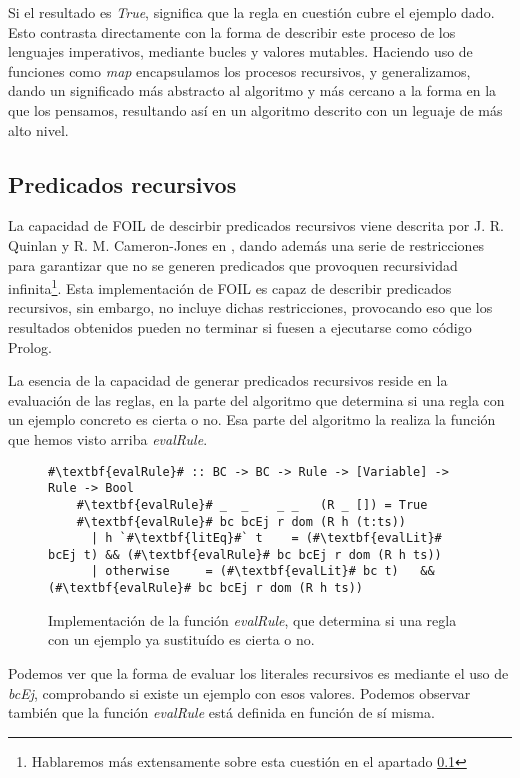 Si el resultado es \emph{True}, significa que la regla en cuestión cubre el ejemplo dado. Esto contrasta directamente con la forma de describir este proceso de los lenguajes imperativos, mediante bucles y valores mutables. Haciendo uso de funciones como \emph{map} encapsulamos los procesos recursivos, y generalizamos, dando un significado más abstracto al algoritmo y más cercano a la forma en la que los pensamos, resultando así en un algoritmo descrito con un leguaje de más alto nivel.

\subsection{Predicados recursivos}
La capacidad de FOIL de descirbir predicados recursivos viene descrita por J. R. Quinlan y R. M. Cameron-Jones en \cite{Quinlan1995}, dando además una serie de restricciones para garantizar que no se generen predicados que provoquen recursividad infinita\footnote{Hablaremos más extensamente sobre esta cuestión en el apartado \ref{}}. Esta implementación de FOIL es capaz de describir predicados recursivos, sin embargo, no incluye dichas restricciones, provocando eso que los resultados obtenidos pueden no terminar si fuesen a ejecutarse como código Prolog.

La esencia de la capacidad de generar predicados recursivos reside en la evaluación de las reglas, en la parte del algoritmo que determina si una regla con un ejemplo concreto es cierta o no. Esa parte del algoritmo la realiza la función que hemos visto arriba \emph{evalRule}.

\begin{figure}
  \begin{lstlisting}[escapechar=\#]
    #\textbf{evalRule}# :: BC -> BC -> Rule -> [Variable] -> Rule -> Bool
    #\textbf{evalRule}# _  _    _ _   (R _ []) = True
    #\textbf{evalRule}# bc bcEj r dom (R h (t:ts))
      | h `#\textbf{litEq}#` t    = (#\textbf{evalLit}# bcEj t) && (#\textbf{evalRule}# bc bcEj r dom (R h ts))
      | otherwise     = (#\textbf{evalLit}# bc t)   && (#\textbf{evalRule}# bc bcEj r dom (R h ts))
  \end{lstlisting}
  \caption{Implementación de la función \emph{evalRule}, que determina si una regla con un ejemplo ya sustituído es cierta o no.}
\end{figure}

Podemos ver que la forma de evaluar los literales recursivos es mediante el uso de \emph{bcEj}, comprobando si existe un ejemplo con esos valores. Podemos observar también que la función \emph{evalRule} está definida en función de sí misma.
